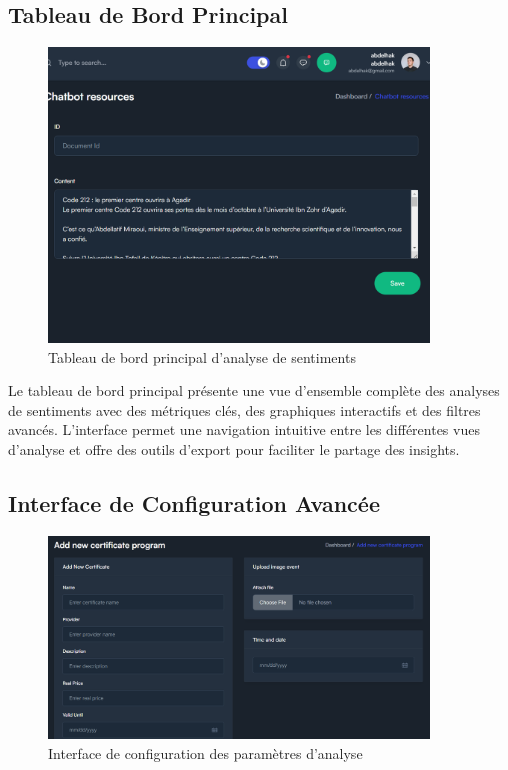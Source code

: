 \subsection{Tableau de Bord Principal}

\begin{figure}[H]
\centering
\includegraphics[width=0.9\textwidth]{assets/images/admin-doc.png}
\caption{Tableau de bord principal d'analyse de sentiments}
\label{fig:main-dashboard}
\end{figure}

Le tableau de bord principal présente une vue d'ensemble complète des analyses de sentiments avec des métriques clés, des graphiques interactifs et des filtres avancés. L'interface permet une navigation intuitive entre les différentes vues d'analyse et offre des outils d'export pour faciliter le partage des insights.

\subsection{Interface de Configuration Avancée}

\begin{figure}[H]
\centering
\includegraphics[width=0.9\textwidth]{assets/images/admin-add-certif.png}
\caption{Interface de configuration des paramètres d'analyse}
\label{fig:config-interface}
\end{figure}

